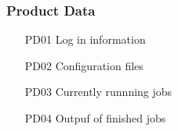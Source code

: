 \subsubsection{Product Data} 
\begin{itemize}
	\item [PD01] Log in information
	\item [PD02] Configuration files
	\item [PD03] Currently runnning jobs
	\item [PD04] Outpuf of finished jobs
	
\end{itemize}

